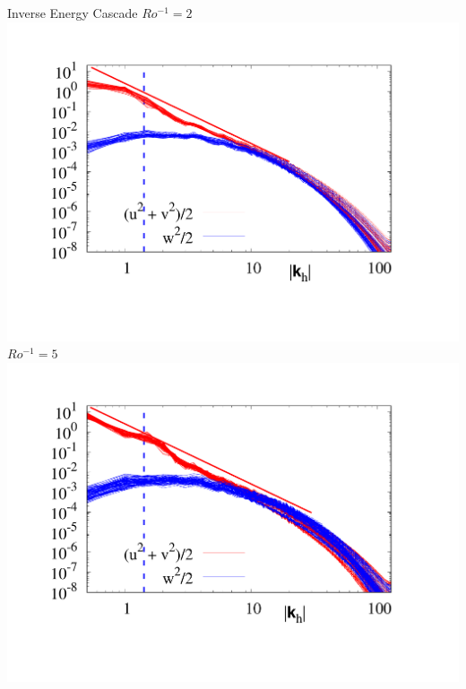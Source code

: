 \documentclass[aspecttatio=169]{beamer}
\begin{document}
\begin{frame}{Inverse Energy Cascade}
        \centering
        {\small $Ro^{-1} = 2$}
        \includegraphics[width=.94\textwidth]{images/Om2Spec.pdf}
    \emp
        \centering
        {\small $Ro^{-1} = 5$}
        \includegraphics[width=.96\textwidth]{images/Om5Spec.pdf}
    \emp

\end{frame}
\end{document}
